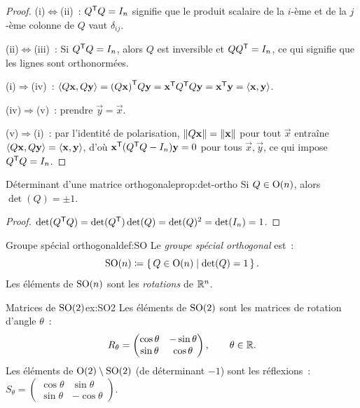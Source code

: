 \begin{proof}
  (i)$\Leftrightarrow$(ii)~: ${Q}^{\mathsf{T}}Q=I_n$ signifie que le
  produit scalaire de la $i$-ème et de la $j$-ème colonne de $Q$ vaut
  $\delta_{ij}$.

  (ii)$\Leftrightarrow$(iii)~: Si ${Q}^{\mathsf{T}}Q=I_n$, alors $Q$ est
  inversible et $Q{Q}^{\mathsf{T}}=I_n$, ce qui signifie que les lignes
  sont orthonormées.

  (i)$\Rightarrow$(iv)~:
  $\langle Q\mathbf{x},Q\mathbf{y}\rangle={(Q\mathbf{x})}^{\mathsf{T}}Q\mathbf{y}
  ={\mathbf{x}}^{\mathsf{T}}{Q}^{\mathsf{T}}Q\mathbf{y}={\mathbf{x}}^{\mathsf{T}}\mathbf{y}
  =\langle\mathbf{x},\mathbf{y}\rangle$.

  (iv)$\Rightarrow$(v)~: prendre $\vec{y}=\vec{x}$.

  (v)$\Rightarrow$(i)~: par l'identité de polarisation,
  $\lVert Q\mathbf{x}\rVert=\lVert\mathbf{x}\rVert$ pour tout $\vec{x}$ entraîne
  $\langle Q\mathbf{x},Q\mathbf{y}\rangle=\langle\mathbf{x},\mathbf{y}\rangle$, d'où
  ${\mathbf{x}}^{\mathsf{T}}({Q}^{\mathsf{T}}Q-I_n)\mathbf{y}=0$ pour tous
  $\vec{x},\vec{y}$, ce qui impose ${Q}^{\mathsf{T}}Q=I_n$.
\end{proof}

\begin{proposition}{Déterminant d'une matrice orthogonale}{prop:det-ortho}
  Si $Q\in\operatorname{O}(n)$, alors $\det(Q)=\pm 1$.
\end{proposition}

\begin{proof}
  $\det({Q}^{\mathsf{T}}Q)=\det({Q}^{\mathsf{T}})\det(Q)=\det(Q)^2=\det(I_n)=1$.
\end{proof}

\begin{definition}{Groupe spécial orthogonal}{def:SO}
  Le \emph{groupe spécial orthogonal} est~:
  \[
    \operatorname{SO}(n)\coloneqq\left\{\,Q\in\operatorname{O}(n)\;\middle|\;\det(Q)=1\,\right\}.
  \]
  Les éléments de $\operatorname{SO}(n)$ sont les \emph{rotations}%
   de ${\mathbb{R}}^n$.
\end{definition}

\begin{example}{Matrices de $\operatorname{SO}(2)$}{ex:SO2}
  Les éléments de $\operatorname{SO}(2)$ sont les matrices de rotation d'angle
  $\theta$~:
  \[
    R_\theta=\begin{pmatrix}\cos\theta&-\sin\theta\\
    \sin\theta&\cos\theta\end{pmatrix},\qquad\theta\in{\mathbb{R}}.
  \]
  Les éléments de $\operatorname{O}(2)\setminus\operatorname{SO}(2)$ (de déterminant $-1$) sont
  les réflexions~:
  $S_\theta=\begin{pmatrix}\cos\theta&\sin\theta\\
  \sin\theta&-\cos\theta\end{pmatrix}$.
\end{example}

